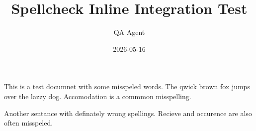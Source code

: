 \documentclass{article}
\title{Spellcheck Inline Integration Test}
\author{QA Agent}
\date{2026-05-16}
\begin{document}
\maketitle

This is a test documnet with some misspeled words.
The qwick brown fox jumps over the lazzy dog.
Accomodation is a commmon misspelling.

Another sentance with definately wrong spellings.
Recieve and occurence are also often misspeled.
\end{document}
